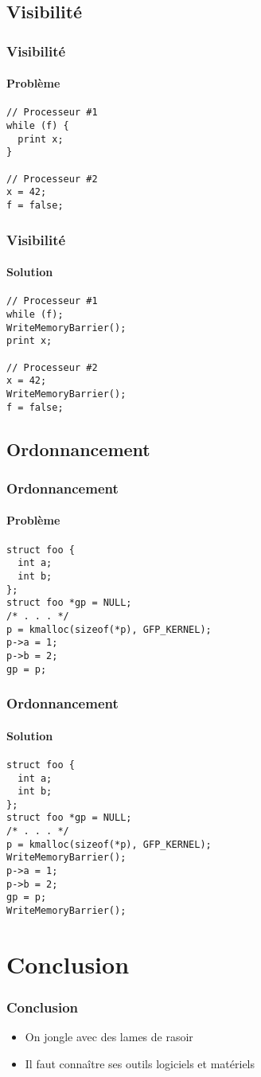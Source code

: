 \documentclass{beamer}
\begin{document}
\subsection{Visibilité}
\begin{frame}[fragile]
\frametitle{Visibilité}
\framesubtitle{Problème}
\begin{lstlisting}
// Processeur #1
while (f) {
  print x;
}

// Processeur #2
x = 42;
f = false;
\end{lstlisting}
\end{frame}

\begin{frame}[fragile]
\frametitle{Visibilité}
\framesubtitle{Solution}
\begin{lstlisting}
// Processeur #1
while (f);
WriteMemoryBarrier();
print x;

// Processeur #2
x = 42;
WriteMemoryBarrier();
f = false;
\end{lstlisting}
\end{frame}

\subsection{Ordonnancement}
\begin{frame}[fragile]
\frametitle{Ordonnancement}
\framesubtitle{Problème}
\begin{lstlisting}
struct foo {
  int a;
  int b;
};
struct foo *gp = NULL;
/* . . . */
p = kmalloc(sizeof(*p), GFP_KERNEL);
p->a = 1;
p->b = 2;
gp = p;
\end{lstlisting}
\end{frame}

\begin{frame}[fragile]
\frametitle{Ordonnancement}
\framesubtitle{Solution}
\begin{lstlisting}
struct foo {
  int a;
  int b;
};
struct foo *gp = NULL;
/* . . . */
p = kmalloc(sizeof(*p), GFP_KERNEL);
WriteMemoryBarrier();
p->a = 1;
p->b = 2;
gp = p;
WriteMemoryBarrier();
\end{lstlisting}
\end{frame}

\section{Conclusion}
\begin{frame}
\frametitle{Conclusion}
\begin{itemize}
\item On jongle avec des lames de rasoir
\item<2-> Il faut connaître ses outils logiciels et matériels
\end{itemize}
\end{frame}
\end{document}
